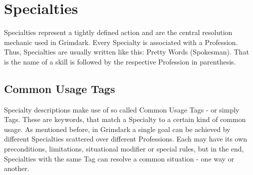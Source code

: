 \section{Specialties}%
\label{sec:Specialties}
Specialties represent a tightly defined action and are the central resolution mechanic used in Grimdark. 
Every Specialty is associated with a Profession.
Thus, Specialties are usually written like this: Pretty Words (Spokesman).
That is the name of a skill is followed by the respective Profession in parenthesis.

\subsection{Common Usage Tags}\label{Tags}
Specialty descriptions make use of so called Common Usage Tags - or simply Tags. 
These are keywords, that match a Specialty to a certain kind of common usage.
As mentioned before, in Grimdark a single goal can be achieved by different Specialties scattered over different Professions.
Each may have its own preconditions, limitations, situational modifier or special rules, but in the end, Specialties with the same Tag can resolve a common situation - one way or another.

